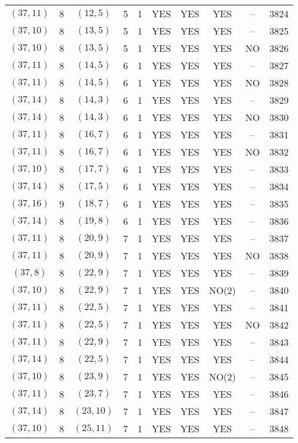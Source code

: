 \begin{longtable}{|c|c|c|c|c|c|c|c|c|c|}
$(37, 11)$ & 8 & $(12, 5)$ & 5 & 1 & YES & YES & YES & -- & 3824\\
$(37, 10)$ & 8 & $(13, 5)$ & 5 & 1 & YES & YES & YES & -- & 3825\\
$(37, 10)$ & 8 & $(13, 5)$ & 5 & 1 & YES & YES & YES & NO & 3826\\
$(37, 11)$ & 8 & $(14, 5)$ & 6 & 1 & YES & YES & YES & -- & 3827\\
$(37, 11)$ & 8 & $(14, 5)$ & 6 & 1 & YES & YES & YES & NO & 3828\\
$(37, 14)$ & 8 & $(14, 3)$ & 6 & 1 & YES & YES & YES & -- & 3829\\
$(37, 14)$ & 8 & $(14, 3)$ & 6 & 1 & YES & YES & YES & NO & 3830\\
$(37, 11)$ & 8 & $(16, 7)$ & 6 & 1 & YES & YES & YES & -- & 3831\\
$(37, 11)$ & 8 & $(16, 7)$ & 6 & 1 & YES & YES & YES & NO & 3832\\
$(37, 10)$ & 8 & $(17, 7)$ & 6 & 1 & YES & YES & YES & -- & 3833\\
$(37, 14)$ & 8 & $(17, 5)$ & 6 & 1 & YES & YES & YES & -- & 3834\\
$(37, 16)$ & 9 & $(18, 7)$ & 6 & 1 & YES & YES & YES & -- & 3835\\
$(37, 14)$ & 8 & $(19, 8)$ & 6 & 1 & YES & YES & YES & -- & 3836\\
$(37, 11)$ & 8 & $(20, 9)$ & 7 & 1 & YES & YES & YES & -- & 3837\\
$(37, 11)$ & 8 & $(20, 9)$ & 7 & 1 & YES & YES & YES & NO & 3838\\
$(37, 8)$ & 8 & $(22, 9)$ & 7 & 1 & YES & YES & YES & -- & 3839\\
$(37, 10)$ & 8 & $(22, 9)$ & 7 & 1 & YES & YES & NO(2) & -- & 3840\\
$(37, 11)$ & 8 & $(22, 5)$ & 7 & 1 & YES & YES & YES & -- & 3841\\
$(37, 11)$ & 8 & $(22, 5)$ & 7 & 1 & YES & YES & YES & NO & 3842\\
$(37, 11)$ & 8 & $(22, 9)$ & 7 & 1 & YES & YES & YES & -- & 3843\\
$(37, 14)$ & 8 & $(22, 5)$ & 7 & 1 & YES & YES & YES & -- & 3844\\
$(37, 10)$ & 8 & $(23, 9)$ & 7 & 1 & YES & YES & NO(2) & -- & 3845\\
$(37, 11)$ & 8 & $(23, 7)$ & 7 & 1 & YES & YES & YES & -- & 3846\\
$(37, 14)$ & 8 & $(23, 10)$ & 7 & 1 & YES & YES & YES & -- & 3847\\
$(37, 10)$ & 8 & $(25, 11)$ & 7 & 1 & YES & YES & YES & -- & 3848\\

\end{longtable}
